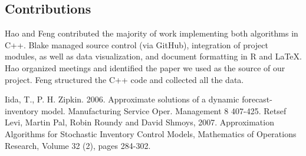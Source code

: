 \documentclass[twoside]{article}
\begin{document}
\begin{multicols}{2}
\section{Contributions}
Hao and Feng contributed the majority of work implementing both algorithms in C++. Blake managed source control (via GitHub), integration of project modules, as well as data visualization, and document formatting in R and \LaTeX. Hao organized meetings and identified the paper we used as the source of our project. Feng structured the C++ code and collected all the data.



\begin{thebibliography}{99} %

Iida, T., P. H. Zipkin. 2006. Approximate solutions of a dynamic forecast-inventory model. Manufacturing Service Oper. Management
8 407-425.
Retsef Levi, Martin Pal, Robin Roundy and David Shmoys, 2007. Approximation Algorithms for Stochastic Inventory Control Models, Mathematics of Operations Research, Volume 32 (2), pages 284-302.

\end{thebibliography}


\end{multicols}
\end{document}
